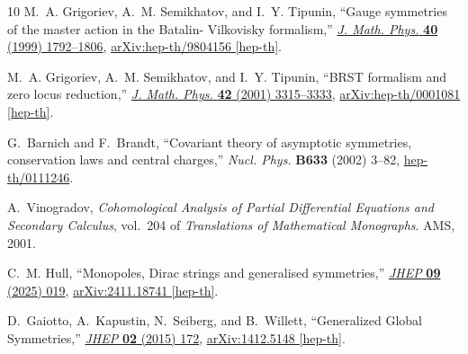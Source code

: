 \documentclass[a4paper,12pt]{article}
\numberwithin{equation}{section} %
\begin{document}
\begin{thebibliography}{10}
M.~A. Grigoriev, A.~M. Semikhatov, and I.~Y. Tipunin, ``{G}auge symmetries of the master action in the {B}atalin- {V}ilkovisky formalism,'' \href{http://dx.doi.org/10.1063/1.532835}{{\em J. Math. Phys.} {\bfseries 40} (1999) 1792--1806},
\href{http://arxiv.org/abs/hep-th/9804156}{{\ttfamily arXiv:hep-th/9804156 [hep-th]}}.

M.~A. Grigoriev, A.~M. Semikhatov, and I.~Y. Tipunin, ``{BRST} formalism and zero locus reduction,'' \href{http://dx.doi.org/10.1063/1.1367867}{{\em J. Math. Phys.} {\bfseries 42} (2001) 3315--3333},
\href{http://arxiv.org/abs/hep-th/0001081}{{\ttfamily arXiv:hep-th/0001081 [hep-th]}}.

G.~Barnich and F.~Brandt, ``{C}ovariant theory of asymptotic symmetries, conservation laws and central charges,'' {\em Nucl. Phys.} {\bfseries B633} (2002) 3--82,
\href{http://arxiv.org/abs/hep-th/0111246}{{\ttfamily hep-th/0111246}}.

A.~Vinogradov, {\em {C}ohomological {A}nalysis of {P}artial {D}ifferential {E}quations and {S}econdary {C}alculus}, vol.~204 of {\em Translations of Mathematical Monographs}.
\newblock AMS, 2001.

C.~M. Hull, ``{Monopoles, Dirac strings and generalised symmetries},'' \href{http://dx.doi.org/10.1007/JHEP09(2025)019}{{\em JHEP} {\bfseries 09} (2025) 019}, \href{http://arxiv.org/abs/2411.18741}{{\ttfamily arXiv:2411.18741 [hep-th]}}.

D.~Gaiotto, A.~Kapustin, N.~Seiberg, and B.~Willett, ``{Generalized Global Symmetries},'' \href{http://dx.doi.org/10.1007/JHEP02(2015)172}{{\em JHEP} {\bfseries 02} (2015) 172}, \href{http://arxiv.org/abs/1412.5148}{{\ttfamily arXiv:1412.5148 [hep-th]}}.

\end{thebibliography}\endgroup
\end{document}
